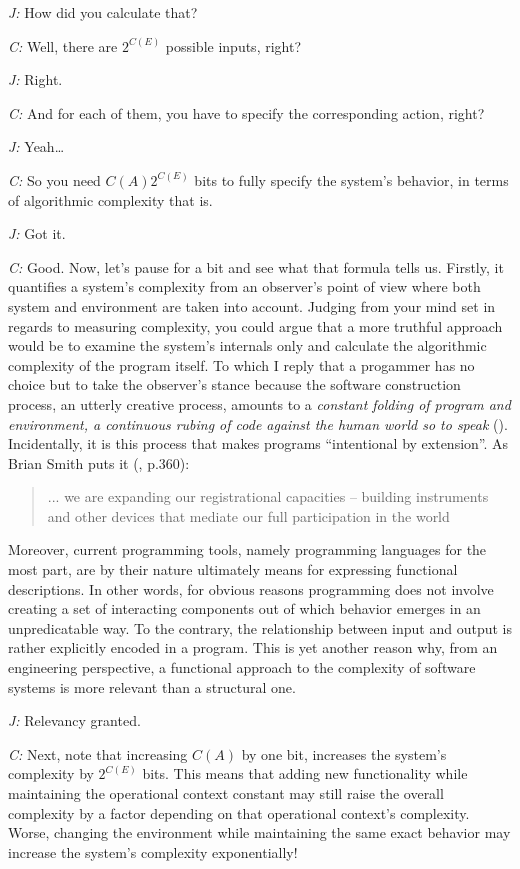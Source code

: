 \documentclass[10pt]{sigplanconf}
\begin{document}
\emph{J:} How did you calculate that?

\emph{C:} Well, there are $2^{C(E)}$ possible inputs, right?

\emph{J:} Right.

\emph{C:} And for each of them, you have to specify the corresponding action, right?

\emph{J:} Yeah\dots

\emph{C:} So you need $C(A)2^{C(E)}$ bits to fully specify the system's behavior, in terms of algorithmic complexity that is.

\emph{J:} Got it.

\emph{C:} Good. Now, let's pause for a bit and see what that formula tells us. Firstly, it quantifies a system's complexity from an observer's point of view where both system and environment are taken into account. Judging from your mind set in regards to measuring complexity, you could argue that a more truthful approach would be to examine the system's internals only and calculate the algorithmic complexity of the program itself. To which I reply that a progammer has no choice but to take the observer's stance because the software construction process, an utterly creative process, amounts to a \emph{constant folding of program and environment, a continuous rubing of code against the human world so to speak} (\cite{evens}). Incidentally, it is this process that makes programs ``intentional by extension''. As Brian Smith puts it (\cite{smith}, p.360):

\begin{quote}
... we are expanding our registrational capacities -- building instruments and other devices that mediate our full participation in the world
\end{quote}

Moreover, current programming tools, namely programming languages for the most part, are by their nature ultimately means for expressing functional descriptions. In other words, for obvious reasons programming does not involve creating a set of interacting components out of which behavior emerges in an unpredicatable way. To the contrary, the relationship between input and output is rather explicitly encoded in a program. This is yet another reason why, from an engineering perspective, a functional approach to the complexity of software systems is more relevant than a structural one.

\emph{J:} Relevancy granted.

\emph{C:} Next, note that increasing $C(A)$ by one bit, increases the system's complexity by $2^{C(E)}$ bits. This means that adding new functionality while maintaining the operational context constant may still raise the overall complexity by a factor depending on that operational context's complexity. Worse, changing the environment while maintaining the same exact behavior may increase the system's complexity exponentially! 
\end{document}

